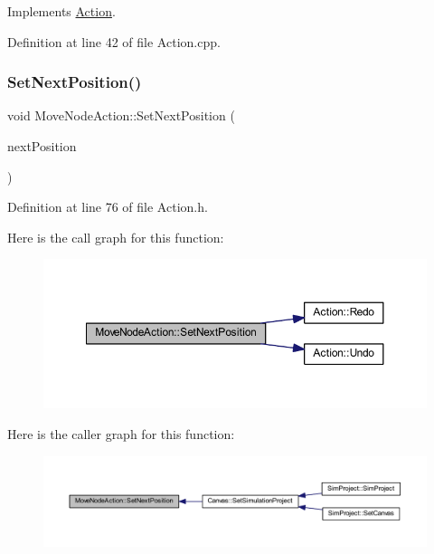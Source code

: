Implements \hyperlink{class_action_a69864cea344385ee84a5120eaab5d82a}{Action}.



Definition at line 42 of file Action.\+cpp.

\mbox{\label{class_move_node_action_a84fd47d3f670edfc79c089d5efb6daca}} 
\subsubsection{\texorpdfstring{Set\+Next\+Position()}{SetNextPosition()}}
{\footnotesize\ttfamily void Move\+Node\+Action\+::\+Set\+Next\+Position (\begin{DoxyParamCaption}\item[{const wx\+Point2\+D\+Double \&}]{next\+Position }\end{DoxyParamCaption})\hspace{0.3cm}{\ttfamily [inline]}}



Definition at line 76 of file Action.\+h.

Here is the call graph for this function\+:\nopagebreak
\begin{figure}[H]
\begin{center}
\leavevmode
\includegraphics[width=350pt]{class_move_node_action_a84fd47d3f670edfc79c089d5efb6daca_cgraph}
\end{center}
\end{figure}
Here is the caller graph for this function\+:
\nopagebreak
\begin{figure}[H]
\begin{center}
\leavevmode
\includegraphics[width=350pt]{class_move_node_action_a84fd47d3f670edfc79c089d5efb6daca_icgraph}
\end{center}
\end{figure}
\mbox{\label{class_move_node_action_a70dcb3f48867ce7b5d57c9d15794984a}} 
